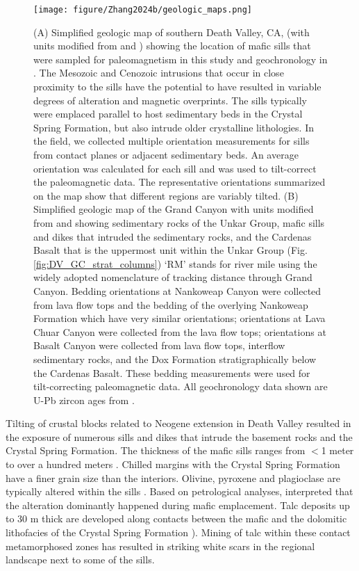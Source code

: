 \begin{figure}[h!]
\centering
\texttt{[image: figure/Zhang2024b/geologic\_maps.png]}
\caption{\footnotesize (A) Simplified geologic map of southern Death Valley, CA, (with units modified from  and ) showing the location of mafic sills that were sampled for paleomagnetism in this study and geochronology in . The Mesozoic and Cenozoic intrusions that occur in close proximity to the sills have the potential to have resulted in variable degrees of alteration and magnetic overprints. The sills typically were emplaced parallel to host sedimentary beds in the Crystal Spring Formation, but also intrude older crystalline lithologies. In the field, we collected multiple orientation measurements for sills from contact planes or adjacent sedimentary beds. An average orientation was calculated for each sill and was used to tilt-correct the paleomagnetic data. The representative orientations summarized on the map show that different regions are variably tilted. (B) Simplified geologic map of the Grand Canyon with units modified from  and  showing sedimentary rocks of the Unkar Group, mafic sills and dikes that intruded the sedimentary rocks, and the Cardenas Basalt that is the uppermost unit within the Unkar Group (Fig. \ref{fig:DV_GC_strat_columns}) `RM' stands for river mile using the widely adopted nomenclature of tracking distance through Grand Canyon. Bedding orientations at Nankoweap Canyon were collected from lava flow tops and the bedding of the overlying Nankoweap Formation which have very similar orientations; orientations at Lava Chuar Canyon were collected from the lava flow tops; orientations at Basalt Canyon were collected from lava flow tops, interflow sedimentary rocks, and the Dox Formation stratigraphically below the Cardenas Basalt. These bedding measurements were used for tilt-correcting paleomagnetic data. All geochronology data shown are U-Pb zircon ages from .}
\label{fig:geologic_maps}
\end{figure}

Tilting of crustal blocks related to Neogene extension in Death Valley resulted in the exposure of numerous sills and dikes that intrude the basement rocks and the Crystal Spring Formation. The thickness of the mafic sills ranges from $<$1 meter to over a hundred meters \cite{Wright1968a, Hammond1983a}. Chilled margins with the Crystal Spring Formation have a finer grain size than the interiors. Olivine, pyroxene and plagioclase are typically altered within the sills \cite{Hammond1983a}. Based on petrological analyses,  interpreted that the alteration dominantly happened during mafic emplacement. Talc deposits up to 30 m thick are developed along contacts between the mafic and the dolomitic lithofacies of the Crystal Spring Formation \cite{Wright1968a}). Mining of talc within these contact metamorphosed zones has resulted in striking white scars in the regional landscape next to some of the sills.

